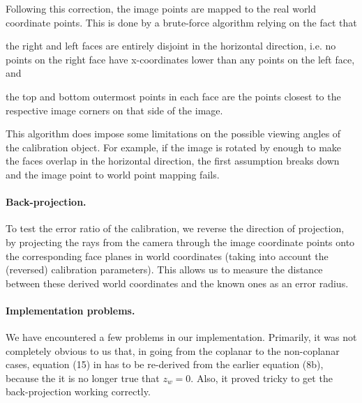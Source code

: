 Following this correction, the image points are mapped to the real
world coordinate points. This is done by a brute-force algorithm
relying on the fact that
\begin{inparaenum}[(a)]
  \item the right and left faces are entirely disjoint in the
    horizontal direction, i.e. no points on the right face have
    x-coordinates lower than any points on the left face, and
  \item the top and bottom outermost points in each face are the
    points closest to the respective image corners on that side of the
    image.
\end{inparaenum}
This algorithm does impose some limitations on the possible viewing
angles of the calibration object. For example, if the image is rotated
by enough to make the faces overlap in the horizontal direction, the
first assumption breaks down and the image point to world point
mapping fails.

\paragraph{Back-projection.}
To test the error ratio of the calibration, we reverse the direction
of projection, by projecting the rays from the camera through the
image coordinate points onto the corresponding face planes in world
coordinates (taking into account the (reversed) calibration
parameters). This allows us to measure the distance between these
derived world coordinates and the known ones as an error radius.

\paragraph{Implementation problems.}
We have encountered a few problems in our implementation. Primarily,
it was not completely obvious to us that, in going from the coplanar
to the non-coplanar cases, equation (15) in \cite{TSAI} has to be
re-derived from the earlier equation (8b), because the it is no longer
true that $z_w=0$. Also, it proved tricky to get the back-projection
working correctly.

%
%
%
%
%
